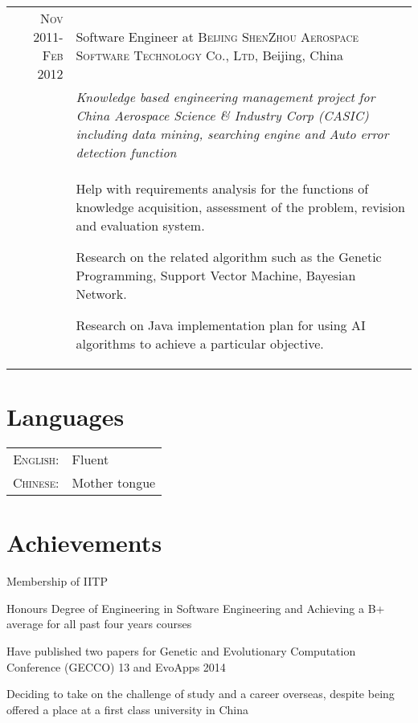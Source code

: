 \documentclass[a4paper,10pt]{article} %
\begin{document}
\begin{tabular}{r|p{11cm}}
\textsc{Nov 2011-Feb 2012} & Software Engineer at \textsc{Beijing ShenZhou Aerospace Software Technology Co., Ltd}, Beijing, China \\
&\emph{Knowledge based engineering management project for China Aerospace Science \& Industry Corp (CASIC) including data mining, searching engine and Auto error detection function}\\
& \footnotesize{Help with requirements analysis for the functions of knowledge acquisition, assessment of the problem, revision and evaluation system.

Research on the related algorithm such as the Genetic Programming, Support Vector Machine, Bayesian Network.

Research on Java implementation plan for using AI algorithms to achieve a particular objective.
}
\end{tabular}




\section{Languages}

\begin{tabular}{rl}
\textsc{English:} & Fluent\\

\textsc{Chinese:} & Mother tongue\\
\end{tabular}


\section{Achievements}

Membership of IITP

Honours Degree of Engineering in Software Engineering and Achieving a B+ average for all past four years courses

Have published two papers for Genetic and Evolutionary Computation Conference (GECCO) 13 and EvoApps 2014

Deciding to take on the challenge of study and a career overseas, despite being offered a place at a first class university in China
\end{document}
